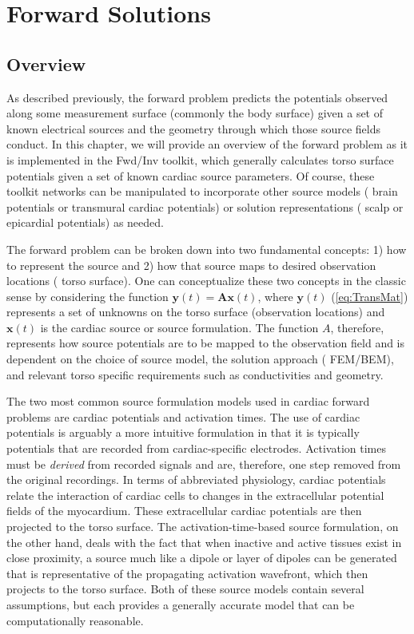 \chapter{Forward Solutions}\label{ch:fwd}

\section{Overview}

As described previously, the forward problem predicts the potentials observed along some measurement surface (commonly the body surface) given a set of known electrical sources and the geometry through which those source fields conduct. In this chapter, we will provide an overview of the forward problem as it is implemented in the Fwd/Inv toolkit, which generally calculates torso surface potentials given a set of known cardiac source parameters. Of course, these toolkit networks can be manipulated to incorporate other source models (\eg{} brain potentials or transmural cardiac potentials) or solution representations (\eg{} scalp or epicardial potentials) as needed.

The forward problem can be broken down into two fundamental concepts: 1) how to represent the source and 2) how that source maps to desired observation locations (\eg{} torso surface). One can conceptualize these two concepts in the classic sense by considering the function $\mathbf{y}(t) = \mathbf{A}\mathbf{x}(t)$,  where $\mathbf{y}(t)$ (\autoref{eq:TransMat}) represents a set of unknowns on the torso surface (observation locations) and $\mathbf{x}(t)$ is the cardiac source or source formulation. The function $A$, therefore, represents how source potentials are to be mapped to the observation field and is dependent on the choice of source model, the solution approach (\ie{} FEM/BEM), and relevant torso specific requirements such as conductivities and geometry.

The two most common source formulation models used in cardiac forward problems are cardiac potentials and activation times. The use of cardiac potentials is arguably a more intuitive formulation in that it is typically potentials that are recorded from cardiac-specific electrodes.  Activation times must be {\em derived} from recorded signals and are, therefore, one step removed from the original recordings.  In terms of abbreviated physiology, cardiac potentials relate the interaction of cardiac cells to changes in the extracellular potential fields of the myocardium. These extracellular cardiac potentials are then projected to the torso surface. The activation-time-based source formulation, on the other hand, deals with the fact that when inactive and active tissues exist in close proximity, a source much like a dipole or layer of dipoles can be generated that is representative of the propagating activation wavefront, which then projects to the torso surface. Both of these source models contain several assumptions, but each provides a generally accurate model that can be computationally reasonable.

